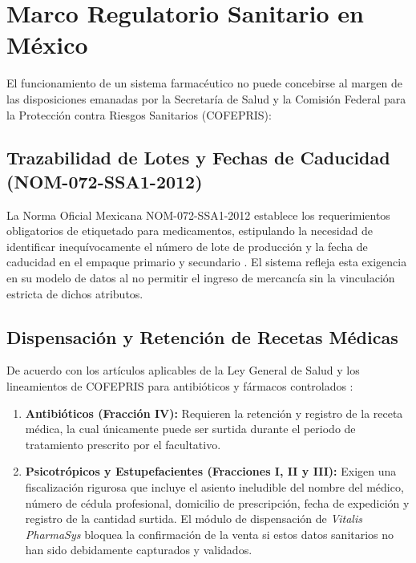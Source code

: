 \section{Marco Regulatorio Sanitario en México}

El funcionamiento de un sistema farmacéutico no puede concebirse al margen de las disposiciones emanadas por la Secretaría de Salud y la Comisión Federal para la Protección contra Riesgos Sanitarios (COFEPRIS):

\subsection{Trazabilidad de Lotes y Fechas de Caducidad (NOM-072-SSA1-2012)}
La Norma Oficial Mexicana NOM-072-SSA1-2012 establece los requerimientos obligatorios de etiquetado para medicamentos, estipulando la necesidad de identificar inequívocamente el número de lote de producción y la fecha de caducidad en el empaque primario y secundario \cite{nom072ssa1}. El sistema refleja esta exigencia en su modelo de datos al no permitir el ingreso de mercancía sin la vinculación estricta de dichos atributos.

\subsection{Dispensación y Retención de Recetas Médicas}
De acuerdo con los artículos aplicables de la Ley General de Salud y los lineamientos de COFEPRIS para antibióticos y fármacos controlados \cite{cofepris2020}:
\begin{enumerate}
    \item \textbf{Antibióticos (Fracción IV):} Requieren la retención y registro de la receta médica, la cual únicamente puede ser surtida durante el periodo de tratamiento prescrito por el facultativo.
    \item \textbf{Psicotrópicos y Estupefacientes (Fracciones I, II y III):} Exigen una fiscalización rigurosa que incluye el asiento ineludible del nombre del médico, número de cédula profesional, domicilio de prescripción, fecha de expedición y registro de la cantidad surtida. El módulo de dispensación de \textit{Vitalis PharmaSys} bloquea la confirmación de la venta si estos datos sanitarios no han sido debidamente capturados y validados.
\end{enumerate}
